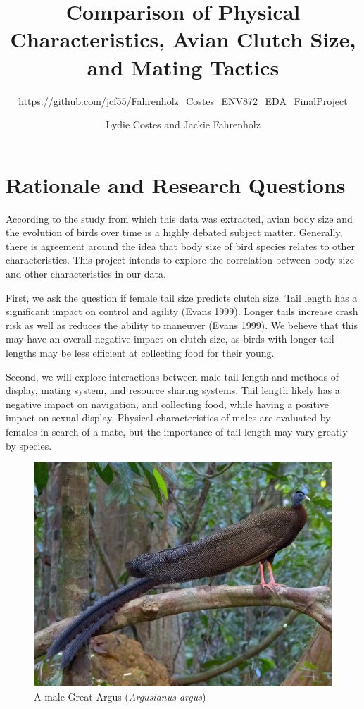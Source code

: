 \documentclass[
  12pt,
]{article}
\title{Comparison of Physical Characteristics, Avian Clutch Size, and
Mating Tactics}
\subtitle{\url{https://github.com/jcf55/Fahrenholz_Costes_ENV872_EDA_FinalProject}}
\author{Lydie Costes and Jackie Fahrenholz}
\date{}
\begin{document}
\maketitle

\newpage
\tableofcontents 
\newpage
\listoftables 
\listoffigures 
\newpage

\hypertarget{rationale-and-research-questions}{%
\section{Rationale and Research
Questions}\label{rationale-and-research-questions}}

According to the study from which this data was extracted, avian body
size and the evolution of birds over time is a highly debated subject
matter. Generally, there is agreement around the idea that body size of
bird species relates to other characteristics. This project intends to
explore the correlation between body size and other characteristics in
our data.

First, we ask the question if female tail size predicts clutch size.
Tail length has a significant impact on control and agility (Evans
1999). Longer tails increase crash risk as well as reduces the ability
to maneuver (Evans 1999). We believe that this may have an overall
negative impact on clutch size, as birds with longer tail lengths may be
less efficient at collecting food for their young.

Second, we will explore interactions between male tail length and
methods of display, mating system, and resource sharing systems. Tail
length likely has a negative impact on navigation, and collecting food,
while having a positive impact on sexual display. Physical
characteristics of males are evaluated by females in search of a mate,
but the importance of tail length may vary greatly by species.

\begin{figure}
\centering
\includegraphics{Images/crested_argus_pheasant.jpeg}
\caption{A male Great Argus (\emph{Argusianus argus})}
\end{figure}
\end{document}
